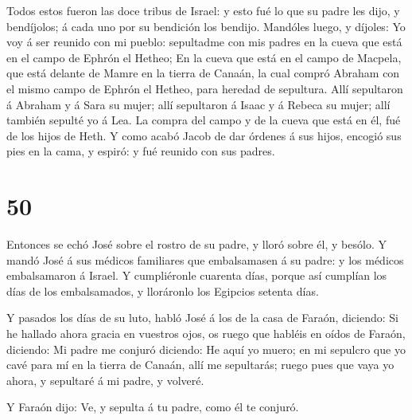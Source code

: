  Todos estos fueron las doce tribus de Israel: y esto fué
lo que su padre les dijo, y bendíjolos; á cada uno por su bendición los
bendijo.  Mandóles luego, y díjoles: Yo voy á ser reunido
con mi pueblo: sepultadme con mis padres en la cueva que está en el
campo de Ephrón el Hetheo;  En la cueva que está en el
campo de Macpela, que está delante de Mamre en la tierra de Canaán, la
cual compró Abraham con el mismo campo de Ephrón el Hetheo, para heredad
de sepultura.  Allí sepultaron á Abraham y á Sara su mujer;
allí sepultaron á Isaac y á Rebeca su mujer; allí también sepulté yo á
Lea.  La compra del campo y de la cueva que está en él, fué
de los hijos de Heth.  Y como acabó Jacob de dar órdenes á
sus hijos, encogió sus pies en la cama, y espiró: y fué reunido con sus
padres.

\hypertarget{section-49}{%
\section{50}\label{section-49}}

 Entonces se echó José sobre el rostro de su padre, y lloró
sobre él, y besólo.  Y mandó José á sus médicos familiares
que embalsamasen á su padre: y los médicos embalsamaron á Israel.
 Y cumpliéronle cuarenta días, porque así cumplían los días
de los embalsamados, y lloráronlo los Egipcios setenta días.

 Y pasados los días de su luto, habló José á los de la casa
de Faraón, diciendo: Si he hallado ahora gracia en vuestros ojos, os
ruego que habléis en oídos de Faraón, diciendo:  Mi padre me
conjuró diciendo: He aquí yo muero; en mi sepulcro que yo cavé para mí
en la tierra de Canaán, allí me sepultarás; ruego pues que vaya yo
ahora, y sepultaré á mi padre, y volveré.

 Y Faraón dijo: Ve, y sepulta á tu padre, como él te
conjuró.

